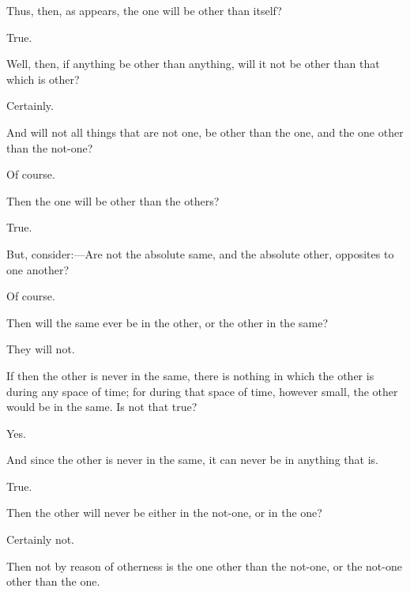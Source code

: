 \documentclass[11pt,letter]{article}
\begin{document}
\par  Thus, then, as appears, the one will be other than itself?

\par  True.

\par  Well, then, if anything be other than anything, will it not be other than that which is other?

\par  Certainly.

\par  And will not all things that are not one, be other than the one, and the one other than the not-one?

\par  Of course.

\par  Then the one will be other than the others?

\par  True.

\par  But, consider:—Are not the absolute same, and the absolute other, opposites to one another?

\par  Of course.

\par  Then will the same ever be in the other, or the other in the same?

\par  They will not.

\par  If then the other is never in the same, there is nothing in which the other is during any space of time; for during that space of time, however small, the other would be in the same. Is not that true?

\par  Yes.

\par  And since the other is never in the same, it can never be in anything that is.

\par  True.

\par  Then the other will never be either in the not-one, or in the one?

\par  Certainly not.

\par  Then not by reason of otherness is the one other than the not-one, or the not-one other than the one.
\end{document}
